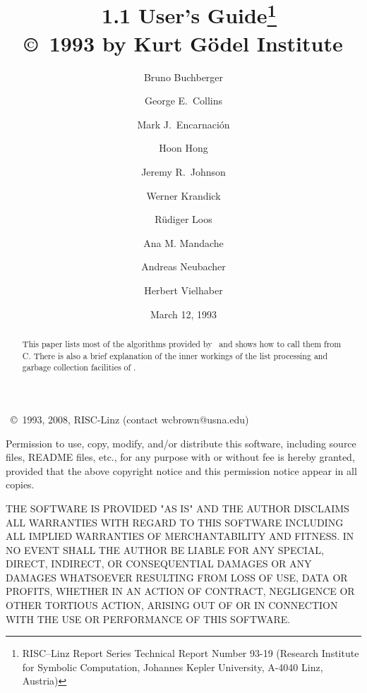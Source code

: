 \documentclass{report}
\begin{document}
\title{
\saclib\ 1.1 User's Guide\thanks{
  RISC--Linz Report Series Technical Report Number 93-19
  (Research Institute for Symbolic Computation, Johannes Kepler University,
  A-4040 Linz, Austria)
}
\\\bigskip \small
\copyright\ 1993 by Kurt G\"{o}del Institute
}

\author{
Bruno Buchberger \and George E.\ Collins \and Mark J.\ Encarnaci\'{o}n \and
Hoon Hong \and Jeremy R.\ Johnson \and Werner Krandick \and R\"{u}diger Loos
\and Ana M. Mandache \and Andreas Neubacher \and Herbert Vielhaber
}

\date{March 12, 1993}
\maketitle


\clearpage \vfill
\begin{center}
  \saclib\ \copyright\ 1993, 2008, RISC-Linz (contact wcbrown@usna.edu)
\end{center}

\bigskip

Permission to use, copy, modify, and/or distribute this software, including
source files, README files, etc., for any purpose with or without fee is
hereby granted, provided that the above copyright notice and this permission
notice appear in all copies.

THE SOFTWARE IS PROVIDED "AS IS" AND THE AUTHOR DISCLAIMS ALL WARRANTIES
WITH REGARD TO THIS SOFTWARE INCLUDING ALL IMPLIED WARRANTIES OF
MERCHANTABILITY AND FITNESS. IN NO EVENT SHALL THE AUTHOR BE LIABLE FOR
ANY SPECIAL, DIRECT, INDIRECT, OR CONSEQUENTIAL DAMAGES OR ANY DAMAGES
WHATSOEVER RESULTING FROM LOSS OF USE, DATA OR PROFITS, WHETHER IN AN
ACTION OF CONTRACT, NEGLIGENCE OR OTHER TORTIOUS ACTION, ARISING OUT OF
OR IN CONNECTION WITH THE USE OR PERFORMANCE OF THIS SOFTWARE.

\vfill

\begin{abstract}
This paper lists most of the algorithms provided by \saclib\ and shows how
to call them from C. There is also a brief explanation of the inner
workings of the list processing and garbage collection facilities of
\saclib.
\end{abstract}
\end{document}
